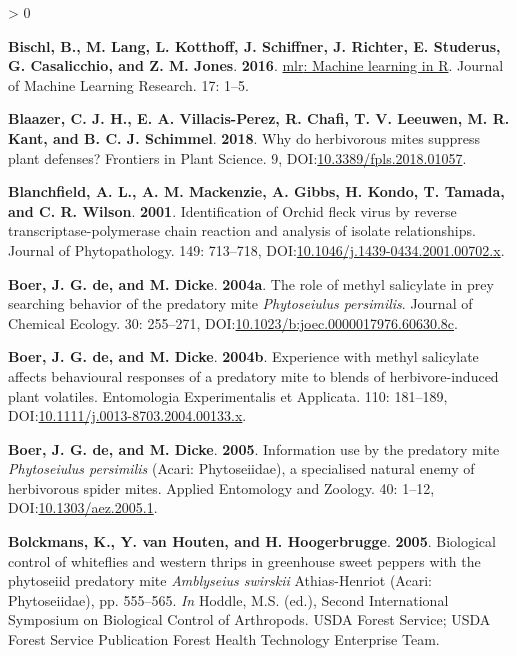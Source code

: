 \documentclass{ufdissertation}[overrideChapters] %
\newlength{\cslhangindent}
\newenvironment{CSLReferences}[2] %
 {%
  \setlength{\parindent}{0pt}
  \ifodd #1 \everypar{\setlength{\hangindent}{\cslhangindent}}\ignorespaces\fi
  \ifnum #2 > 0
  \setlength{\parskip}{#2\baselineskip}
  \fi
 }%
 {}
\begin{document}
{\begin{CSLReferences}{1}{1}
\leavevmode{}%
\textbf{Bischl, B., M. Lang, L. Kotthoff, J. Schiffner, J. Richter, E. Studerus, G. Casalicchio, and Z. M. Jones}. \textbf{2016}. \href{https://jmlr.org/papers/v17/15-066.html}{{mlr}: Machine learning in {R}}. Journal of Machine Learning Research. 17: 1--5.

\leavevmode{}%
\textbf{Blaazer, C. J. H., E. A. Villacis-Perez, R. Chafi, T. V. Leeuwen, M. R. Kant, and B. C. J. Schimmel}. \textbf{2018}. Why do herbivorous mites suppress plant defenses? Frontiers in Plant Science. 9, DOI:\href{https://doi.org/10.3389/fpls.2018.01057}{10.3389/fpls.2018.01057}.

\leavevmode{}%
\textbf{Blanchfield, A. L., A. M. Mackenzie, A. Gibbs, H. Kondo, T. Tamada, and C. R. Wilson}. \textbf{2001}. Identification of {Orchid fleck virus} by reverse transcriptase-polymerase chain reaction and analysis of isolate relationships. Journal of Phytopathology. 149: 713--718, DOI:\href{https://doi.org/10.1046/j.1439-0434.2001.00702.x}{10.1046/j.1439-0434.2001.00702.x}.

\leavevmode{}%
\textbf{Boer, J. G. de, and M. Dicke}. \textbf{2004a}. The role of methyl salicylate in prey searching behavior of the predatory mite {\emph{Phytoseiulus persimilis}}. Journal of Chemical Ecology. 30: 255--271, DOI:\href{https://doi.org/10.1023/b:joec.0000017976.60630.8c}{10.1023/b:joec.0000017976.60630.8c}.

\leavevmode{}%
\textbf{Boer, J. G. de, and M. Dicke}. \textbf{2004b}. Experience with methyl salicylate affects behavioural responses of a predatory mite to blends of herbivore-induced plant volatiles. Entomologia Experimentalis et Applicata. 110: 181--189, DOI:\href{https://doi.org/10.1111/j.0013-8703.2004.00133.x}{10.1111/j.0013-8703.2004.00133.x}.

\leavevmode{}%
\textbf{Boer, J. G. de, and M. Dicke}. \textbf{2005}. Information use by the predatory mite {\emph{Phytoseiulus persimilis}} {({Acari}: {Phytoseiidae})}, a specialised natural enemy of herbivorous spider mites. Applied Entomology and Zoology. 40: 1--12, DOI:\href{https://doi.org/10.1303/aez.2005.1}{10.1303/aez.2005.1}.

\leavevmode{}%
\textbf{Bolckmans, K., Y. van Houten, and H. Hoogerbrugge}. \textbf{2005}. Biological control of whiteflies and western thrips in greenhouse sweet peppers with the phytoseiid predatory mite {\emph{Amblyseius swirskii}} {Athias-Henriot} ({Acari}: {Phytoseiidae}), pp. 555--565. \emph{In} Hoddle, M.S. (ed.), Second International Symposium on Biological Control of Arthropods. USDA Forest Service; USDA Forest Service Publication Forest Health Technology Enterprise Team.


\end{CSLReferences}}
\end{document}

